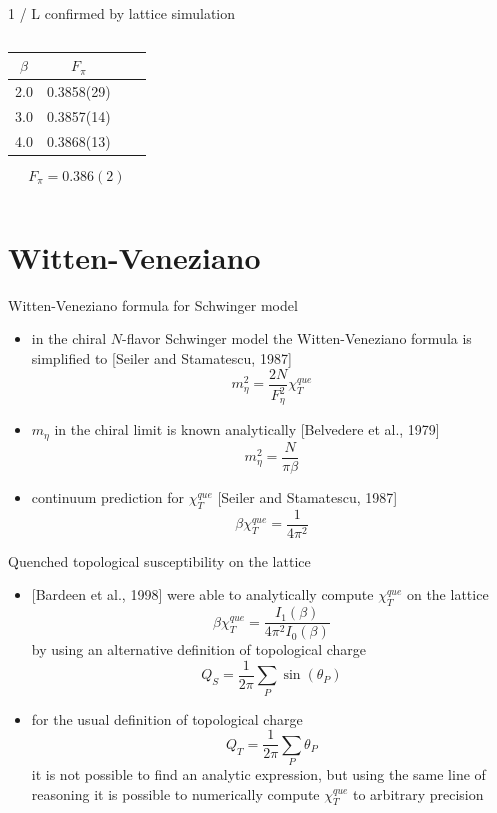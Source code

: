 \documentclass[english]{beamer}
\begin{document}
\begin{frame}{1 / L confirmed by lattice simulation}
\begin{columns}[t]
      \begin{center} 
	    \begin{tabular}{c c c c}
	      $\beta$ & $F_\pi$ \\
	      \hline
	      2.0 & 0.3858(29) \\
	      \hline
	      3.0 & 0.3857(14) \\
	      \hline
	      4.0 & 0.3868(13) \\
	    \end{tabular}
        \[
      	  F_\pi = 0.386(2)
        \]
      \end{center}	 
  \end{columns}
\end{frame}


\section{Witten-Veneziano}

\begin{frame}{Witten-Veneziano formula for Schwinger model}
  \begin{itemize}
    \item in the chiral $N$-flavor Schwinger model the
      Witten-Veneziano formula is simplified to [Seiler and
      Stamatescu, 1987]
      \[
        m_\eta^2 = \frac{2N}{F_\eta^2}\chi_T^{que}
      \]
    \item $m_\eta$ in the chiral limit is known analytically
      [Belvedere et al., 1979] 
      \[
        m_\eta^2 = \frac{N}{\pi\beta}
      \]
    \item continuum prediction for $\chi_T^{que}$
      [Seiler and Stamatescu, 1987]
      \[
        \beta\chi_T^{que} = \frac{1}{4\pi^2}
      \]
  \end{itemize}
\end{frame}

\begin{frame}{Quenched topological susceptibility on the lattice}
  \begin{itemize}
    \item {[Bardeen et al., 1998]} were able to analytically
      compute $\chi_T^{que}$ on the lattice
      \[
        \beta\chi_T^{que} = \frac{I_1(\beta)}{4 \pi^2 I_0(\beta)}
      \]
      \setlength{\abovedisplayskip}{6pt}
      by using an alternative definition of topological charge
      \[
        Q_S = \frac{1}{2\pi}\sum_{P}\sin(\theta_P)
      \]
    \setlength{\belowdisplayskip}{4pt} 
    \item for the usual definition of topological charge
      \[
        Q_T = \frac{1}{2\pi}\sum_{P}\theta_P
      \] 
      it is not possible to find an analytic expression, but using the 
      same line of reasoning it is possible to numerically compute
      $\chi_T^{que}$ to arbitrary precision
  \end{itemize}
\end{frame}
\end{document}
